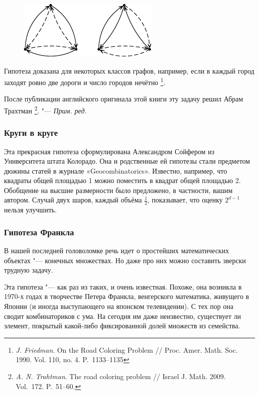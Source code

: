 \documentclass[twoside]{book}
\newenvironment{addedbytheeditors}{\par\medskip\small
}{\par\addvspace{\medskipamount}} %
\begin{document}
\begin{figure}[!ht]
\centering
\includegraphics[scale=1.1]{mp/wink-33}
\end{figure}

Гипотеза доказана для некоторых классов графов, например, если в каждый город заходят ровно две дороги и число городов нечётно%
\footnote{\emph{J. Friedman}. On the Road Coloring Problem /\!/ {Proc. Amer. Math. Soc.} %
1990. Vol. 110, no. 4. P.~1133--1135}.

\begin{addedbytheeditors}
После публикации английского оригинала этой книги эту задачу решил Абрам Трахтман%
\footnote{\emph{A. N. Trahtman}. The road coloring problem /\!/ {Israel J. Math.} 2009. Vol.~172. P.~51--60.}. "---
\emph{Прим. ред.}
\end{addedbytheeditors}


\subsubsection*{Круги в круге}

Эта прекрасная гипотеза сформулирована Александром Сойфером из
Университета штата Колорадо.
Она и родственные ей гипотезы стали
предметом дюжины статей в журнале «Geo\-com\-bi\-na\-tor\-ics».
Известно, например, что квадраты общей площадью 1 можно поместить в
квадрат общей площадью 2.
Обобщение на высшие размерности было
предложено, в частности, вашим автором.
Случай двух шаров, каждый
объёма $\tfrac12$, показывает, что оценку $2^{d-1}$ нельзя улучшить.

\subsubsection*{Гипотеза Франкла}

В нашей последней головоломке речь идет о простейших математических
объектах "--- конечных множествах. Но даже про них можно составить
зверски трудную задачу.


Эта гипотеза "--- как раз из таких, и очень известная. Похоже, она
возникла в 1970-х годах в творчестве Петера Франкла, венгерского
математика, живущего в Японии (и иногда выступающего на японском
телевидении).
С тех пор она сводит комбинаториков с ума.
На сегодня
им даже неизвестно, существует ли элемент, покрытый какой-либо
фиксированной долей множеств из семейства.
\end{document}
